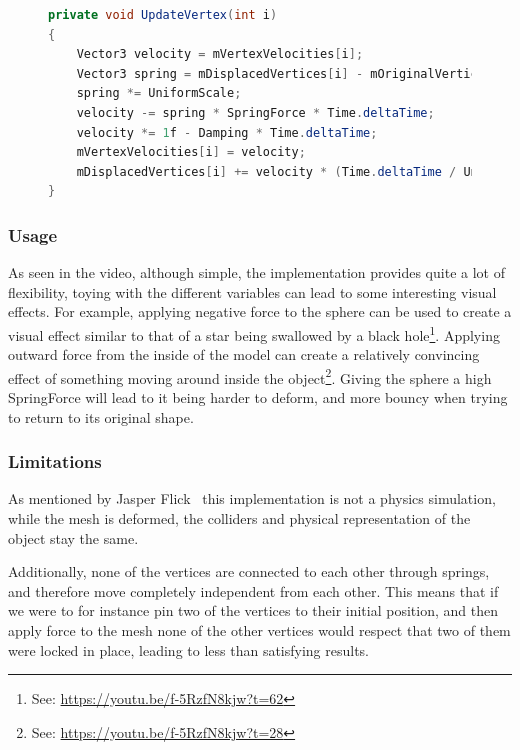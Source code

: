 \begin{figure}
\begin{lstlisting}[label={code:catlike_mesh_deformation_update},language=csharp,caption={Catlike coding mesh deformation vertex update}]
private void UpdateVertex(int i)
{
    Vector3 velocity = mVertexVelocities[i];
    Vector3 spring = mDisplacedVertices[i] - mOriginalVertices[i];
    spring *= UniformScale;
    velocity -= spring * SpringForce * Time.deltaTime;
    velocity *= 1f - Damping * Time.deltaTime;
    mVertexVelocities[i] = velocity;
    mDisplacedVertices[i] += velocity * (Time.deltaTime / UniformScale);
}
\end{lstlisting}
\end{figure}

\subsubsection{Usage}
As seen in the video, although simple, the implementation provides quite a lot of flexibility, toying with the different variables
can lead to some interesting visual effects.
For example, applying negative force to the sphere can be used to create a visual effect similar to that of a star being swallowed by a black hole\footnote{See: \url{https://youtu.be/f-5RzfN8kjw?t=62}}.
Applying outward force from the inside of the model can create a relatively convincing effect of something moving around inside the object\footnote{See: \url{https://youtu.be/f-5RzfN8kjw?t=28}}.
Giving the sphere a high SpringForce will lead to it being harder to deform, and more bouncy when trying to return to its original shape.

\subsubsection{Limitations}
As mentioned by Jasper Flick~\cite{catlike_mesh_deformation} this implementation is not a physics simulation, while the mesh is deformed,
the colliders and physical representation of the object stay the same.

Additionally, none of the vertices are connected to each other through springs, and therefore move completely independent from each other.
This means that if we were to for instance pin two of the vertices to their initial position, and then apply force to the mesh
none of the other vertices would respect that two of them were locked in place, leading to less than satisfying results.

